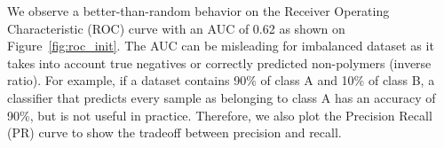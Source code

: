 We observe a better-than-random behavior on the Receiver Operating Characteristic (ROC) curve with an AUC of 0.62 as shown on 
Figure~\ref{fig:roc_init}. %
The AUC can be misleading for imbalanced dataset as it takes into account true negatives or correctly predicted non-polymers (inverse ratio).
For example, if a dataset contains 90\% of class A and 10\% of class B, 
a classifier that predicts every sample as belonging to class A has an accuracy of 90\%, 
but is not useful in practice.
Therefore, we also plot the Precision Recall (PR) curve to show the tradeoff between precision and recall.%
